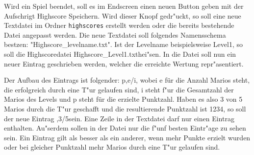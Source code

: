 Wird ein Spiel beendet, soll es im Endscreen einen neuen Button geben mit der Aufschrigt \glqq Highscore Speichern\grqq.
Wird dieser Knopf gedr"uckt, so soll eine neue Textdatei im Ordner \texttt{highscores} erstellt werden oder die bereits bestehende Datei angepasst werden. 
Die neue Textdatei soll folgendes Namensschema bestzen: "Highscore\_levelname.txt". Ist der Levelname beispielsweise \glqq Level1\grqq, so soll die Highscoredatei \glqq Highscore\_Level1.txt\grqq hei"sen.
In die Datei soll nun ein neuer Eintrag geschrieben werden, welcher die erreichte Wertung repr"asentiert. 

Der Aufbau des Eintrags ist folgender: \glqq p,e/i\grqq, wobei e für die Anzahl Marios steht, die erfolgreich durch eine T"ur gelaufen sind, i steht f"ur die Gesamtzahl der Marios des Levels und p steht für die erzielte Punktzahl.
Haben es also 3 von 5 Marios durch die T"ur geschafft und die resultierende Punktzahl ist 1234, so soll der neue Eintrag ,3/5\grqq sein.
Eine Zeile in der Textdatei darf nur einen Eintrag enthalten.
Au"serdem sollen in der Datei nur die f"unf besten Eintr"age zu sehen sein.
Ein Eintrag gilt als besser als ein anderer, wenn mehr Punkte erzielt wurden oder bei gleicher Punktzahl mehr Marios durch eine T"ur gelaufen sind.